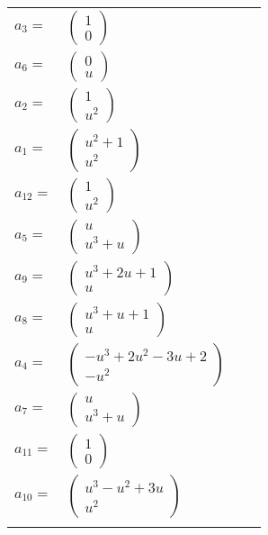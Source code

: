 \documentclass[1p]{elsarticle_modified}
\theoremstyle{definition}
\begin{document}
\begin{tabular}{m{7pt} m{180pt} m{7pt} m{180pt} }
\flushright $a_{3}=$&$\begin{pmatrix}1\\0\end{pmatrix}$ \\
\flushright $a_{6}=$&$\begin{pmatrix}0\\u\end{pmatrix}$ \\
\flushright $a_{2}=$&$\begin{pmatrix}1\\u^2\end{pmatrix}$ \\
\flushright $a_{1}=$&$\begin{pmatrix}u^2+1\\u^2\end{pmatrix}$ \\
\flushright $a_{12}=$&$\begin{pmatrix}1\\u^2\end{pmatrix}$ \\
\flushright $a_{5}=$&$\begin{pmatrix}u\\u^3+u\end{pmatrix}$ \\
\flushright $a_{9}=$&$\begin{pmatrix}u^3+2 u+1\\u\end{pmatrix}$ \\
\flushright $a_{8}=$&$\begin{pmatrix}u^3+u+1\\u\end{pmatrix}$ \\
\flushright $a_{4}=$&$\begin{pmatrix}- u^3+2 u^2-3 u+2\\- u^2\end{pmatrix}$ \\
\flushright $a_{7}=$&$\begin{pmatrix}u\\u^3+u\end{pmatrix}$ \\
\flushright $a_{11}=$&$\begin{pmatrix}1\\0\end{pmatrix}$ \\
\flushright $a_{10}=$&$\begin{pmatrix}u^3- u^2+3 u\\u^2\end{pmatrix}$\\&\end{tabular}
\end{document}
